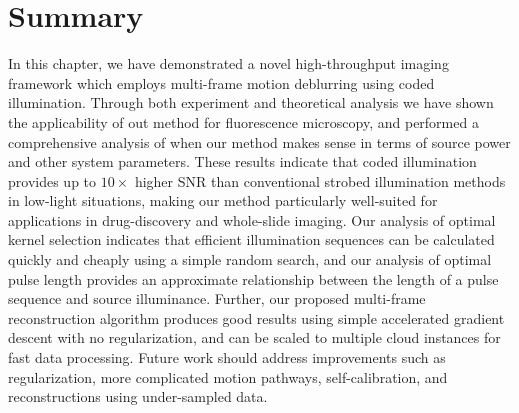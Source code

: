 \section{Summary}
In this chapter, we have demonstrated a novel high-throughput imaging framework which employs multi-frame motion deblurring using coded illumination. Through both experiment and theoretical analysis we have shown the applicability of out method for fluorescence microscopy, and performed a comprehensive analysis of when our method makes sense in terms of source power and other system parameters. These results indicate that coded illumination provides up to $10\times$ higher SNR than conventional strobed illumination methods in low-light situations, making our method particularly well-suited for applications in drug-discovery and whole-slide imaging. Our analysis of optimal kernel selection indicates that efficient illumination sequences can be calculated quickly and cheaply using a simple random search, and our analysis of optimal pulse length provides an approximate relationship between the length of a pulse sequence and source illuminance. Further, our proposed multi-frame reconstruction algorithm produces good results using simple accelerated gradient descent with no regularization, and can be scaled to multiple cloud instances for fast data processing. Future work should address improvements such as regularization, more complicated motion pathways, self-calibration, and reconstructions using under-sampled data.